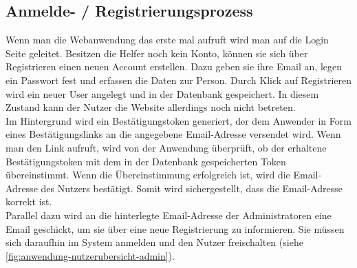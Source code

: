 \documentclass[fontsize=12pt,openright,oneside,paper=a4,BCOR=1cm]{scrbook}
\begin{document}
\subsection{Anmelde- / Registrierungsprozess}

Wenn man die Webanwendung das erste mal aufruft wird man auf die Login Seite geleitet. Besitzen die Helfer noch kein Konto, können sie sich über \glqq Registrieren\grqq{} einen neuen Account erstellen. Dazu geben sie ihre Email an, legen ein Passwort fest und erfassen die Daten zur Person. Durch Klick auf \glqq Registrieren\grqq{} wird ein neuer User angelegt und in der Datenbank gespeichert. In diesem Zustand kann der Nutzer die Website allerdings noch nicht betreten. \\
Im Hintergrund wird ein Bestätigungstoken generiert, der dem Anwender in Form eines Bestätigungslinks an die angegebene Email-Adresse versendet wird. Wenn man den Link aufruft, wird von der Anwendung überprüft, ob der erhaltene Bestätigungstoken mit dem in der Datenbank gespeicherten Token übereinstimmt. Wenn die Übereinstimmung erfolgreich ist, wird die Email-Adresse des Nutzers bestätigt. Somit wird sichergestellt, dass die Email-Adresse korrekt ist. \\
Parallel dazu wird an die hinterlegte Email-Adresse der Administratoren eine Email geschickt, um sie über eine neue Registrierung zu informieren. Sie müssen sich daraufhin im System anmelden und den Nutzer freischalten (siehe \ref{fig:anwendung-nutzerubersicht-admin}).
\end{document}
